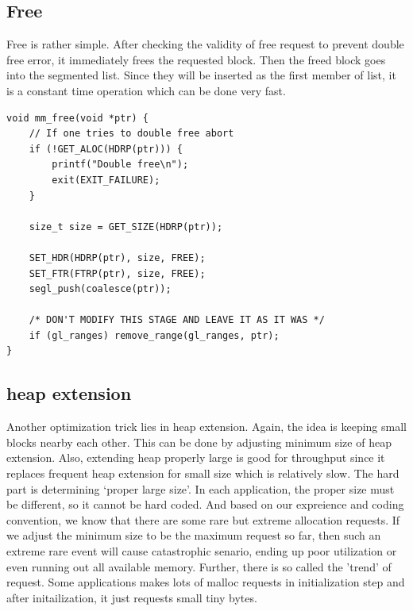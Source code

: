\documentclass[fleqn]{article}
\begin{document}
\subsection{Free}

Free is rather simple. After checking the validity of free request to prevent double free error, it immediately frees the requested block. Then the freed block goes into the segmented list. Since they will be inserted as the first member of list, it is a constant time operation which can be done very fast.

\small
\begin{verbatim}
void mm_free(void *ptr) {
    // If one tries to double free abort
    if (!GET_ALOC(HDRP(ptr))) {
        printf("Double free\n");
        exit(EXIT_FAILURE);
    }

    size_t size = GET_SIZE(HDRP(ptr));

    SET_HDR(HDRP(ptr), size, FREE);
    SET_FTR(FTRP(ptr), size, FREE);
    segl_push(coalesce(ptr));

    /* DON'T MODIFY THIS STAGE AND LEAVE IT AS IT WAS */
    if (gl_ranges) remove_range(gl_ranges, ptr);
}
\end{verbatim}
\normalsize

\subsection{heap extension}

Another optimization trick lies in heap extension. Again, the idea is keeping small blocks nearby each other. This can be done by adjusting minimum size of heap extension. Also, extending heap properly large is good for throughput since it replaces frequent heap extension for small size which is relatively slow. The hard part is determining `proper large size'. In each application, the proper size must be different, so it cannot be hard coded. And based on our expreience and coding convention, we know that there are some rare but extreme allocation requests. If we adjust the minimum size to be the maximum request so far, then such an extreme rare event will cause catastrophic senario, ending up poor utilization or even running out all available memory. Further, there is so called the 'trend' of request. Some applications makes lots of malloc requests in initialization step and after initailization, it just requests small tiny bytes.
\end{document}
